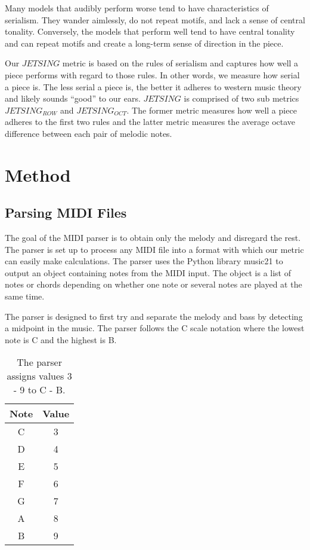 \documentclass[11pt]{article}
\begin{document}
Many models that audibly perform worse tend to have characteristics of serialism.
They wander aimlessly, do not repeat motifs, and lack a sense of central tonality.
Conversely, the models that perform well tend to have central tonality and can repeat motifs and create a long-term sense of direction in the piece.

Our $JETSING$ metric is based on the rules of serialism and captures how well a piece performs with regard to those rules.
In other words, we measure how serial a piece is.
The less serial a piece is, the better it adheres to western music theory and likely sounds “good” to our ears.
$JETSING$ is comprised of two sub metrics $JETSING_{ROW}$ and $JETSING_{OCT}$.
The former metric measures how well a piece adheres to the first two rules and the latter metric measures the average octave difference between each pair of melodic notes.

\section{Method}
\subsection{Parsing MIDI Files}

The goal of the MIDI parser is to obtain only the melody and disregard the rest.
The parser is set up to process any MIDI file into a format with which our metric can easily make calculations.
The parser uses the Python library music21 to output an object containing notes from the MIDI input.
The object is a list of notes or chords depending on whether one note or several notes are played at the same time.

The parser is designed to first try and separate the melody and bass by detecting a midpoint in the music.
The parser follows the C scale notation where the lowest note is C and the highest is B.

\begin{table}
\begin{tabular}{c c}
    \hline
    Note & Value \\
    \hline
    C & 3 \\
    \hline
    D & 4 \\
    \hline
    E & 5 \\
    \hline
    F & 6 \\
    \hline
    G & 7 \\
    \hline
    A & 8 \\
    \hline
    B & 9 \\
    \hline
\end{tabular}
\caption{The parser assigns values 3 - 9 to C - B.}
\end{table}
\end{document}

